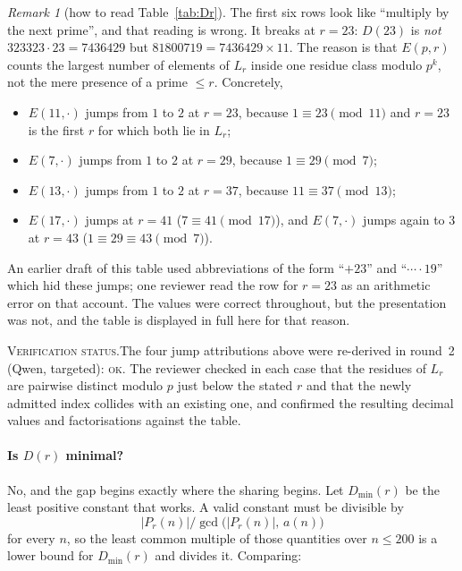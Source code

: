 \documentclass[11pt]{article}
\theoremstyle{plain}
\theoremstyle{definition}
\theoremstyle{remark}
\newtheorem*{remark}{Remark}
\numberwithin{equation}{section}
\newcommand{\Lr}{L_r}
\newcommand{\vstatus}[1]{%
  \par\vspace{3pt}\noindent
  {\small\textsc{Verification status.}\enspace #1}\par\vspace{3pt}}
\begin{document}
\begin{remark}[how to read Table~\ref{tab:Dr}]
The first six rows look like ``multiply by the next prime'', and that reading is wrong. It breaks
at $r = 23$: $D(23)$ is \emph{not} $323323\cdot 23 = 7436429$ but
$81800719 = 7436429 \times 11$. The reason is that $E(p,r)$ counts the largest number of
elements of $\Lr$ inside one residue class modulo $p^k$, not the mere presence of a prime
$\le r$. Concretely,
\begin{itemize}
\item $E(11,\cdot)$ jumps from $1$ to $2$ at $r=23$, because $1 \equiv 23 \pmod{11}$ and $r=23$
  is the first $r$ for which both lie in $\Lr$;
\item $E(7,\cdot)$ jumps from $1$ to $2$ at $r=29$, because $1 \equiv 29 \pmod 7$;
\item $E(13,\cdot)$ jumps from $1$ to $2$ at $r=37$, because $11 \equiv 37 \pmod{13}$;
\item $E(17,\cdot)$ jumps at $r=41$ ($7 \equiv 41 \pmod{17}$), and $E(7,\cdot)$ jumps again to
  $3$ at $r=43$ ($1 \equiv 29 \equiv 43 \pmod 7$).
\end{itemize}
An earlier draft of this table used abbreviations of the form ``$+23$'' and ``$\cdots\cdot 19$''
which hid these jumps; one reviewer read the row for $r=23$ as an arithmetic error on that
account. The values were correct throughout, but the presentation was not, and the table is
displayed in full here for that reason.
\end{remark}
\vstatus{The four jump attributions above were re-derived in round~2 (Qwen, targeted):
\textsc{ok}. The reviewer checked in each case that the residues of $\Lr$ are pairwise distinct
modulo $p$ just below the stated $r$ and that the newly admitted index collides with an existing
one, and confirmed the resulting decimal values and factorisations against the table.}

\paragraph{Is $D(r)$ minimal?} No, and the gap begins exactly where the sharing begins. Let
$D_{\min}(r)$ be the least positive constant that works. A valid constant must be divisible by
\[
  |P_r(n)| \big/ \gcd\bigl(|P_r(n)|,\,a(n)\bigr)
\]
for every $n$, so the least common multiple of those quantities over $n \le 200$ is a lower bound
for $D_{\min}(r)$ and divides it. Comparing:
\end{document}

